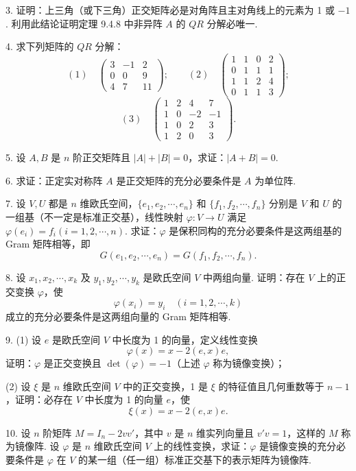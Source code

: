 \documentclass[UTF8,12pt,a4paper,fontset=fandol]{ctexart}
\begin{document}
3. 证明：上三角（或下三角）正交矩阵必是对角阵且主对角线上的元素为 1 或 $-1$. 利用此结论证明定理 9.4.8 中非异阵 $A$ 的 $QR$ 分解必唯一.

4. 求下列矩阵的 $QR$ 分解：
\[
  (1)\quad
  \left(\begin{array}{ccc}
    3 & -1 & 2\\
    0 & 0 & 9\\
    4 & 7 & 11
  \end{array}\right);
  \qquad
  (2)\quad
  \left(\begin{array}{cccc}
    1 & 1 & 0 & 2\\
    0 & 1 & 1 & 1\\
    1 & 1 & 2 & 4\\
    0 & 1 & 1 & 3
  \end{array}\right);
\]
\[
  (3)\quad
  \left(\begin{array}{cccc}
    1 & 2 & 4 & 7\\
    1 & 0 & -2 & -1\\
    1 & 0 & 2 & 3\\
    1 & 2 & 0 & 3
  \end{array}\right).
\]

5. 设 $A,B$ 是 $n$ 阶正交矩阵且 $|A|+|B|=0$，求证：$|A+B|=0$.

6. 求证：正定实对称阵 $A$ 是正交矩阵的充分必要条件是 $A$ 为单位阵.

7. 设 $V,U$ 都是 $n$ 维欧氏空间，$\{e_1,e_2,\cdots,e_n\}$ 和 $\{f_1,f_2,\cdots,f_n\}$ 分别是 $V$ 和 $U$ 的一组基（不一定是标准正交基），线性映射 $\varphi:V\to U$ 满足 $\varphi(e_i)=f_i(i=1,2,\cdots,n)$. 求证：$\varphi$ 是保积同构的充分必要条件是这两组基的 Gram 矩阵相等，即
\[
  G(e_1,e_2,\cdots,e_n)=G(f_1,f_2,\cdots,f_n).
\]

8. 设 $x_1,x_2,\cdots,x_k$ 及 $y_1,y_2,\cdots,y_k$ 是欧氏空间 $V$ 中两组向量. 证明：存在 $V$ 上的正交变换 $\varphi$，使
\[
  \varphi(x_i)=y_i\quad(i=1,2,\cdots,k)
\]
成立的充分必要条件是这两组向量的 Gram 矩阵相等.

9. (1) 设 $e$ 是欧氏空间 $V$ 中长度为 1 的向量，定义线性变换
\[
  \varphi(x)=x-2(e,x)e,
\]
证明：$\varphi$ 是正交变换且 $\det(\varphi)=-1$（上述 $\varphi$ 称为镜像变换）；

(2) 设 $\xi$ 是 $n$ 维欧氏空间 $V$ 中的正交变换，1 是 $\xi$ 的特征值且几何重数等于 $n-1$，证明：必存在 $V$ 中长度为 1 的向量 $e$，使
\[
  \xi(x)=x-2(e,x)e.
\]

10. 设 $n$ 阶矩阵 $M=I_n-2vv'$，其中 $v$ 是 $n$ 维实列向量且 $v'v=1$，这样的 $M$ 称为镜像阵. 设 $\varphi$ 是 $n$ 维欧氏空间 $V$ 上的线性变换，求证：$\varphi$ 是镜像变换的充分必要条件是 $\varphi$ 在 $V$ 的某一组（任一组）标准正交基下的表示矩阵为镜像阵.
\end{document}
